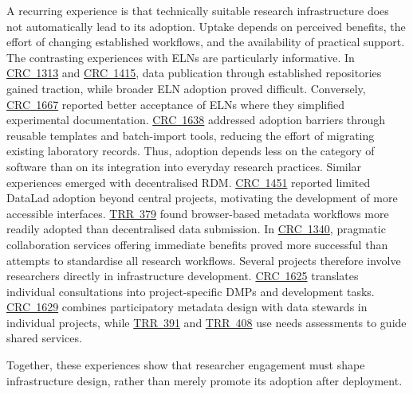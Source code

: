 \documentclass{eceasst}
\begin{document}
A recurring experience is that technically suitable
research infrastructure does not automatically lead
to its adoption. Uptake depends on perceived benefits,
the effort of changing established workflows, and
the availability of practical support.
The contrasting experiences with ELNs
are particularly informative.
In \hyperref[subsec:crc1313]{CRC~1313} and
\hyperref[subsec:crc1415]{CRC~1415}, data publication
through established repositories gained traction,
while broader ELN adoption proved difficult.
Conversely, \hyperref[subsec:crc1667]{CRC~1667}
reported better acceptance of ELNs where they
simplified experimental documentation.
\hyperref[subsec:crc1638]{CRC~1638} addressed
adoption barriers through reusable templates and
batch-import tools, reducing the effort of migrating
existing laboratory records.
Thus, adoption depends less on the category of
software than on its integration into everyday
research practices.
Similar experiences emerged with decentralised RDM.
\hyperref[subsec:crc1451]{CRC~1451} reported
limited DataLad adoption beyond central projects,
motivating the development of more accessible
interfaces. \hyperref[subsec:trr379]{TRR~379}
found browser-based metadata workflows more readily
adopted than decentralised data submission.
In \hyperref[subsec:crc1340]{CRC~1340}, pragmatic
collaboration services offering immediate benefits
proved more successful than attempts to standardise
all research workflows.
Several projects therefore involve researchers
directly in infrastructure development.
\hyperref[subsec:crc1625]{CRC~1625} translates
individual consultations into project-specific
DMPs and development tasks.
\hyperref[subsec:crc1629]{CRC~1629} combines
participatory metadata design with data stewards
in individual projects, while
\hyperref[subsec:trr391]{TRR~391} and
\hyperref[subsec:trr408]{TRR~408} use needs
assessments to guide shared services.

Together, these experiences show that researcher
engagement must shape infrastructure design,
rather than merely promote its adoption after deployment.
\end{document}
